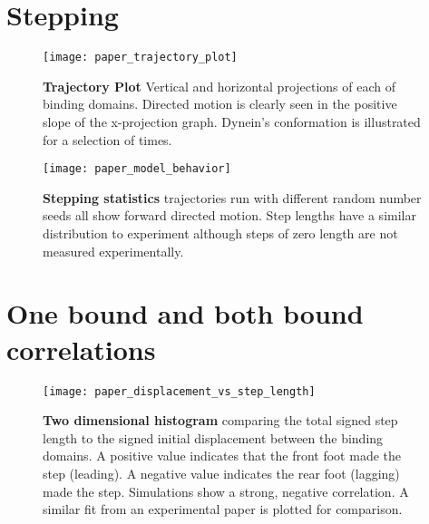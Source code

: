 

\section{Stepping}
\begin{figure}
	\centering
	\texttt{[image: paper\_trajectory\_plot]}
	\caption{\textbf{Trajectory Plot} Vertical and horizontal projections of each of binding domains. Directed motion is clearly seen in the positive slope of the x-projection graph. Dynein's conformation is illustrated for a selection of times.}
	\label{fig:trajectory}
\end{figure}
	
	
\begin{figure}
	\centering
	\texttt{[image: paper\_model\_behavior]}
	\caption{\textbf{Stepping statistics} trajectories run with different random number seeds all show forward directed motion. Step lengths have a similar distribution to experiment although steps of zero length are not measured experimentally. }
	\label{Fig:statistics}
\end{figure}


\section{One bound and both bound correlations}
\begin{figure}[!hbt]
	\centering
	\texttt{[image: paper\_displacement\_vs\_step\_length]}
	\caption{\textbf{Two dimensional histogram} comparing the total signed step length to
			the signed initial displacement between the binding domains. A positive value
			indicates that the front foot made the step (leading). A negative value
			indicates the rear foot (lagging) made the step. Simulations show a strong,
			negative correlation. A similar fit from an experimental paper is plotted for comparison.}
	\label{fig:displacement_vs_step_length}
\end{figure}
	
